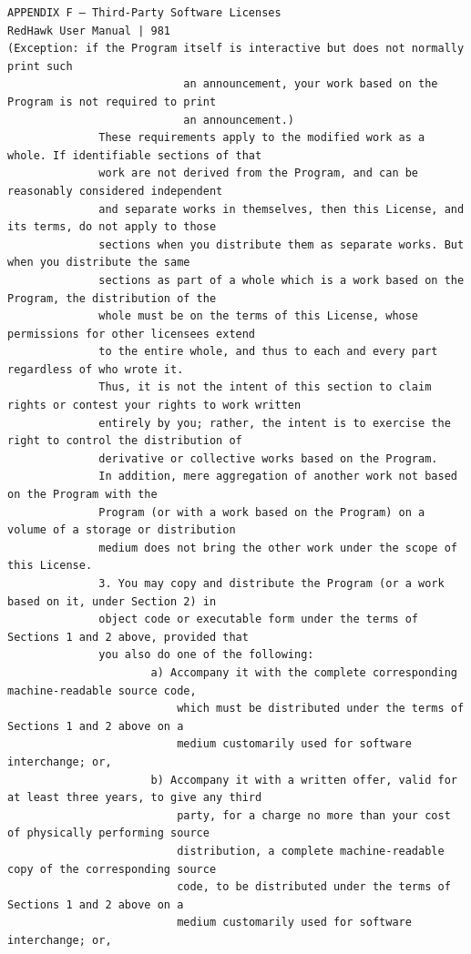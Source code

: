 \begin{lstlisting}[basicstyle=\ttfamily\scriptsize,breaklines=true]
APPENDIX F — Third-Party Software Licenses                                      RedHawk User Manual | 981
(Exception: if the Program itself is interactive but does not normally print such
                           an announcement, your work based on the Program is not required to print
                           an announcement.)
              These requirements apply to the modified work as a whole. If identifiable sections of that
              work are not derived from the Program, and can be reasonably considered independent
              and separate works in themselves, then this License, and its terms, do not apply to those
              sections when you distribute them as separate works. But when you distribute the same
              sections as part of a whole which is a work based on the Program, the distribution of the
              whole must be on the terms of this License, whose permissions for other licensees extend
              to the entire whole, and thus to each and every part regardless of who wrote it.
              Thus, it is not the intent of this section to claim rights or contest your rights to work written
              entirely by you; rather, the intent is to exercise the right to control the distribution of
              derivative or collective works based on the Program.
              In addition, mere aggregation of another work not based on the Program with the
              Program (or with a work based on the Program) on a volume of a storage or distribution
              medium does not bring the other work under the scope of this License.
              3. You may copy and distribute the Program (or a work based on it, under Section 2) in
              object code or executable form under the terms of Sections 1 and 2 above, provided that
              you also do one of the following:
                      a) Accompany it with the complete corresponding machine-readable source code,
                          which must be distributed under the terms of Sections 1 and 2 above on a
                          medium customarily used for software interchange; or,
                      b) Accompany it with a written offer, valid for at least three years, to give any third
                          party, for a charge no more than your cost of physically performing source
                          distribution, a complete machine-readable copy of the corresponding source
                          code, to be distributed under the terms of Sections 1 and 2 above on a
                          medium customarily used for software interchange; or,

\end{lstlisting}
